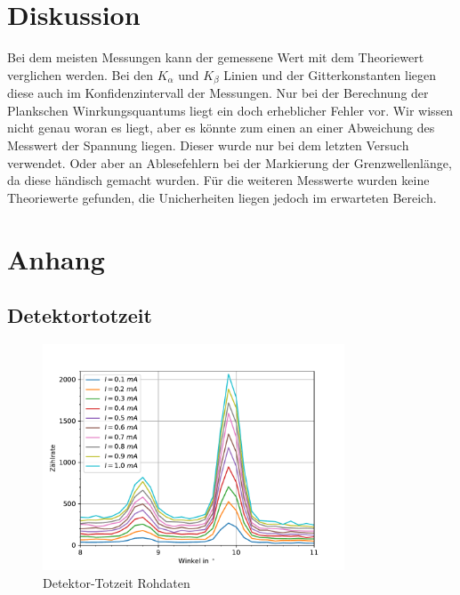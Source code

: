 \documentclass[11pt, a4paper]{article}
\begin{document}
    \section{Diskussion}

    Bei dem meisten Messungen kann der gemessene Wert mit dem Theoriewert verglichen werden. Bei den $K_{\alpha}$ und $K_{\beta}$ Linien und der Gitterkonstanten liegen diese auch im Konfidenzintervall der Messungen. Nur bei der Berechnung der Plankschen Winrkungsquantums liegt ein doch erheblicher Fehler vor. Wir wissen nicht genau woran es liegt, aber es könnte zum einen an einer Abweichung des Messwert der Spannung liegen. Dieser wurde nur bei dem letzten Versuch verwendet. Oder aber an Ablesefehlern bei der Markierung der Grenzwellenlänge, da diese händisch gemacht wurden. Für die weiteren Messwerte wurden keine Theoriewerte gefunden, die Unicherheiten liegen jedoch im erwarteten Bereich.

    \section{Anhang}

    \subsection{Detektortotzeit}

    \begin{figure}
        \centering
        \includegraphics[width=0.8\textwidth]{DetektortotzeitRoh.pdf}
        \caption{Detektor-Totzeit Rohdaten}
        \label{fig:totzeitroh}
    \end{figure}


    
    
\end{document}
